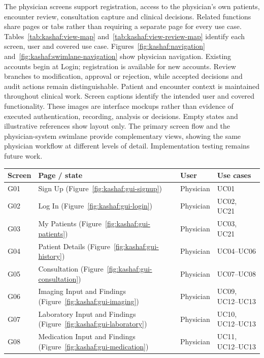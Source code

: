 The physician screens support registration, access to the physician's own patients, encounter review, consultation capture and clinical decisions. Related functions share pages or tabs rather than requiring a separate page for every use case. Tables~\ref{tab:kashaf:view-map} and~\ref{tab:kashaf:view-review-map} identify each screen, user and covered use case. Figures~\ref{fig:kashaf:navigation} and~\ref{fig:kashaf:swimlane-navigation} show physician navigation. Existing accounts begin at Login; registration is available for new accounts. Review branches to modification, approval or rejection, while accepted decisions and audit actions remain distinguishable. Patient and encounter context is maintained throughout clinical work. Screen captions identify the intended user and covered functionality. These images are interface mockups rather than evidence of executed authentication, recording, analysis or decisions. Empty states and illustrative references show layout only. The primary screen flow and the physician-system swimlane provide complementary views, showing the same physician workflow at different levels of detail. Implementation testing remains future work.

\begin{reporttable}
\centering
\small
\caption{Physician access, patient and input screens mapped to users and use cases.}
\label{tab:kashaf:view-map}
\begin{tabular}{|p{}|p{}|p{}|p{}|}
\hline
Screen & Page / state & User & Use cases \\ \hline
G01 & Sign Up (Figure~\ref{fig:kashaf:gui-signup}) & Physician & UC01 \\ \hline
G02 & Log In (Figure~\ref{fig:kashaf:gui-login}) & Physician & UC02, UC21 \\ \hline
G03 & My Patients (Figure~\ref{fig:kashaf:gui-patients}) & Physician & UC03, UC21 \\ \hline
G04 & Patient Details (Figure~\ref{fig:kashaf:gui-history}) & Physician & UC04--UC06 \\ \hline
G05 & Consultation (Figure~\ref{fig:kashaf:gui-consultation}) & Physician & UC07--UC08 \\ \hline
G06 & Imaging Input and Findings (Figure~\ref{fig:kashaf:gui-imaging}) & Physician & UC09, UC12--UC13 \\ \hline
G07 & Laboratory Input and Findings (Figure~\ref{fig:kashaf:gui-laboratory}) & Physician & UC10, UC12--UC13 \\ \hline
G08 & Medication Input and Findings (Figure~\ref{fig:kashaf:gui-medication}) & Physician & UC11, UC12--UC13 \\ \hline
\end{tabular}
\end{reporttable}

